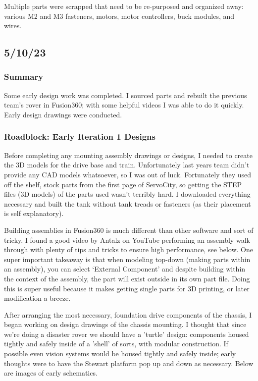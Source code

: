 \documentclass[a4paper, 10pt]{article}
\begin{document}
		Multiple parts were scrapped that need to be re-purposed and organized away: various M2 and M3 fasteners, motors, motor controllers, buck modules, and wires.
		
	\subsection{5/10/23}
		\subsubsection{Summary}
		Some early design work was completed. I sourced parts and rebuilt the previous team's rover in Fusion360; with some helpful videos I was able to do it quickly. Early design drawings were conducted.
		
		\subsubsection{Roadblock: Early Iteration 1 Designs}
		Before completing any mounting assembly drawings or designs, I needed to create the 3D models for the drive base and train. Unfortunately last years team didn't provide any CAD models whatsoever, so I was out of luck. Fortunately they used off the shelf, stock parts from the first page of ServoCity, so getting the STEP files (3D models) of the parts used wasn't terribly hard. I downloaded everything necessary and built the tank  without tank treads or fasteners (as their placement is self explanatory). 
		
		Building assemblies in Fusion360 is much different than other software and sort of tricky. I found a good video by Antalz on YouTube performing an assembly walk through with plenty of tips and tricks to ensure high performance, see below. One super important takeaway is that when modeling top-down (making parts within an assembly), you can select `External Component' and despite building within the context of the assembly, the part will exist outside in its own part file. Doing this is super useful because it makes getting single parts for 3D printing, or later modification a breeze.
		
		After arranging the most necessary, foundation drive components of the chassis, I began working on design drawings of the chassis mounting. I thought that since we're doing a disaster rover we should have a 'turtle' design: components housed tightly and safely inside of a 'shell' of sorts, with modular construction. If possible even vision systems would be housed tightly and safely inside; early thoughts were to have the Stewart platform pop up and down as necessary. Below are images of early schematics.
		
\end{document}
